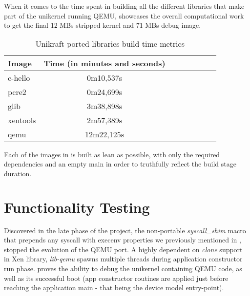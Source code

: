 When it comes to the time spent in building all the different libraries that make part of the unikernel running QEMU,  showcases the overall computational work to get the final 12 MBs stripped kernel and 71 MBs debug image.

\begin{center}
\begin{table}[htb]
  \caption{Unikraft ported libraries build time metrics}
  \begin{tabular}{l*{6}{c}r}
    Image & Time (in minutes and seconds) \\
    \hline
    c-hello &  0m10,537s \\
    pcre2 & 0m24,699s  \\
    glib & 3m38,898s \\
    xentools & 2m57,389s \\
    qemu & 12m22,125s \\
  \end{tabular}
  \label{table:time-metrics}
\end{table}
\end{center}

Each of the images in  is built as lean as possible, with only the required dependencies and an empty main in order to truthfully reflect the build stage duration.

\section{Functionality Testing}
\label{sec:functionality-testing}

Discovered in the late phase of the project, the non-portable \textit{syscall_shim} macro that prepends any syscall with execenv properties we previously mentioned in , stopped the evolution of the QEMU port.
A highly dependent on \textit{clone} support in Xen library, \textit{lib-qemu} spawns multiple threads during application constructor run phase.
 proves the ability to debug the unikernel containing QEMU code, as well as its successful boot (app constructor routines are applied just before reaching the application main - that being the device model entry-point).

